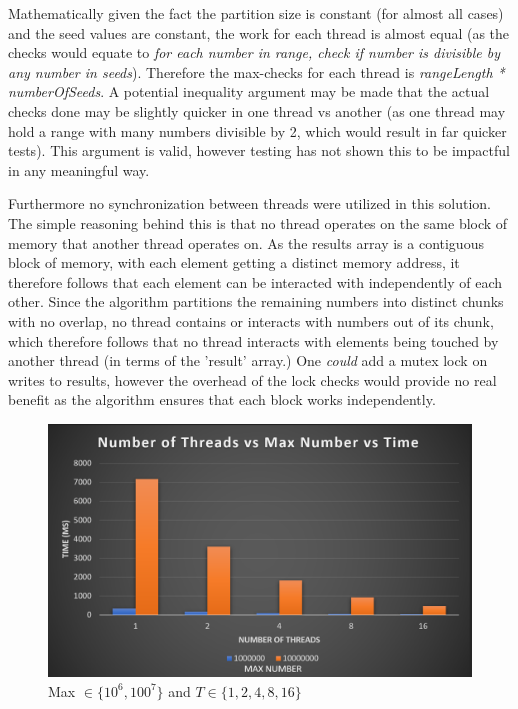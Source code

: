Mathematically given the fact the partition size is 
constant (for almost all cases) and the seed values are constant, the work for 
each thread is almost equal (as the checks would equate to 
\textit{for each number in range, check if number is divisible by any number in seeds}). Therefore the 
max-checks for each thread is \textit{rangeLength * numberOfSeeds}. A potential 
inequality argument may be made that the actual checks done may be slightly 
quicker in one thread vs another (as one thread may hold a range with many 
numbers divisible by 2, which would result in far quicker tests). This argument 
is valid, however testing has not shown this to be impactful in any meaningful 
way.

Furthermore no synchronization between threads were utilized in this solution. 
The simple reasoning behind this is that no thread operates on the same block 
of memory that another thread operates on. As the results array is a contiguous 
block of memory, with each element getting a distinct memory address, it 
therefore follows that each element can be interacted with independently of each 
other. Since the algorithm partitions the remaining numbers into distinct chunks 
with no overlap, no thread contains or interacts with numbers out of its chunk, 
which therefore follows that no thread interacts with elements being touched by 
another thread (in terms of the 'result' array.) One \textit{could} add a mutex lock 
on writes to results, however the overhead of the lock checks would provide no 
real benefit as the algorithm ensures that each block works independently. 

\begin{figure}
    \centering
    \includegraphics[width=\linewidth]{Figures/maxNumHigh.png}
    \caption{Max $\in \{10^6, 100^7\}$ and $T \in \{1, 2, 4, 8, 16\}$}
    \label{fig:maxnumhigh}
\end{figure}

